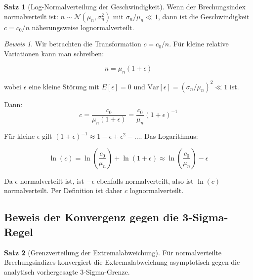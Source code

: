 \documentclass[12pt,a4paper,oneside]{article}
\theoremstyle{definition}
\newtheorem{satz}{Satz}[section]
\theoremstyle{remark}
\newtheorem*{beweis}{Beweis}
\newcommand{\cLight}{c}
\newcommand{\refIndex}{n}
\begin{document}
\begin{satz}[Log-Normalverteilung der Geschwindigkeit]
Wenn der Brechungsindex normalverteilt ist: $\refIndex \sim \mathcal{N}(\mu_n, \sigma_n^2)$ mit $\sigma_n / \mu_n \ll 1$, dann ist die Geschwindigkeit $\cLight = \cLight_0 / \refIndex$ näherungsweise lognormalverteilt.
\end{satz}

\begin{beweis}
Wir betrachten die Transformation $\cLight = \cLight_0 / \refIndex$. Für kleine relative Variationen kann man schreiben:

\begin{equation}
    \refIndex = \mu_n(1 + \epsilon)
\end{equation}

wobei $\epsilon$ eine kleine Störung mit $E[\epsilon] = 0$ und $\text{Var}[\epsilon] = (\sigma_n/\mu_n)^2 \ll 1$ ist.

Dann:
\begin{equation}
    \cLight = \frac{\cLight_0}{\mu_n(1+\epsilon)} = \frac{\cLight_0}{\mu_n}(1+\epsilon)^{-1}
\end{equation}

Für kleine $\epsilon$ gilt $(1+\epsilon)^{-1} \approx 1 - \epsilon + \epsilon^2 - \ldots$. Das Logarithmus:

\begin{equation}
    \ln(\cLight) = \ln\left(\frac{\cLight_0}{\mu_n}\right) + \ln(1+\epsilon) \approx \ln\left(\frac{\cLight_0}{\mu_n}\right) - \epsilon
\end{equation}

Da $\epsilon$ normalverteilt ist, ist $-\epsilon$ ebenfalls normalverteilt, also ist $\ln(\cLight)$ normalverteilt. Per Definition ist daher $\cLight$ lognormalverteilt.
\end{beweis}

\subsection{Beweis der Konvergenz gegen die 3-Sigma-Regel}

\begin{satz}[Grenzverteilung der Extremalabweichung]
Für normalverteilte Brechungsindizes konvergiert die Extremalabweichung asymptotisch gegen die analytisch vorhergesagte 3-Sigma-Grenze.
\end{satz}
\end{document}
